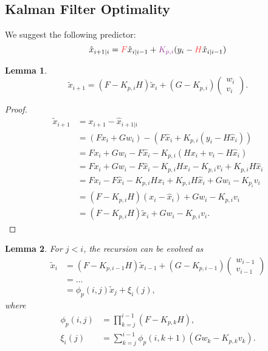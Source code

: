 \documentclass[a4 paper]{article}
\numberwithin{equation}{section}
\theoremstyle{boldStyle}
\theoremstyle{boldBlueStyle}
\newtheorem{lemma}{Lemma}[section]
\theoremstyle{boldPurpleStyle}
\theoremstyle{boldRedStyle}
\theoremstyle{boldGreenStyle}
\begin{document}
\subsection*{Kalman Filter Optimality}

We suggest the following predictor:
\begin{equation}
    \hat{x}_{i+1|i} = \tred{F} \hat{x}_{i|i-1} + \tpur{K_{p,i}} (y_i - \tred{H} \hat{x}_{i|i-1})
\end{equation}

\begin{lemma}
  \begin{equation}
    \tilde{x}_{i+1} = (F - K_{p,i} H) \tilde{x}_i + (G - K_{p,i}) 
    \begin{pmatrix}
    w_i \\
    v_i
    \end{pmatrix}.
    \end{equation}
\end{lemma}

\begin{proof}
\begin{align*}
\tilde{x}_{i+1} &= x_{i+1} - \hat{x}_{i+1|i} \\
&= (F x_i + G w_i) - \left( F \hat{x}_i + K_{p,i} (y_i - H \hat{x}_i) \right) \\
&= F x_i + G w_i - F \hat{x}_i - K_{p,i} (H x_i + v_i - H \hat{x}_i) \\
&= F x_i + G w_i - F \hat{x}_i - K_{p,i} H x_i - K_{p,i} v_i + K_{p,i} H \hat{x}_i \\
&= F x_i - F \hat{x}_i - K_{p,i} H x_i + K_{p,i} H \hat{x}_i + G w_i - K_{p_i} v_i \\
&= (F - K_{p,i} H)(x_i - \hat{x}_i) + G w_i - K_{p,i} v_i \\
&= (F - K_{p,i} H) \tilde{x}_i + G w_i - K_{p,i} v_i.
\end{align*}
\end{proof}


\begin{lemma}
  For \( j < i \), the recursion can be evolved as
  \begin{align*}
      \tilde{x}_i &= (F - K_{p,i-1}H) \tilde{x}_{i-1} + (G - K_{p,i-1})
      \begin{pmatrix}
          w_{i-1} \\
          v_{i-1}
      \end{pmatrix} \\
      &= \ldots \\
      &= \phi_p(i, j) \tilde{x}_j + \xi_i(j),
  \end{align*}
  where
  \begin{align*}
      \phi_p(i, j) &= \prod_{k=j}^{i-1} (F - K_{p,k}H), \\
      \xi_i(j) &= \sum_{k=j}^{i-1} \phi_p(i, k+1) (G w_k - K_{p,k} v_k).
  \end{align*}
  \end{lemma}  
\end{document}
